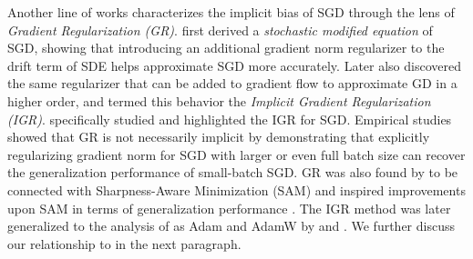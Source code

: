 

Another line of works characterizes the implicit bias of SGD through the lens of \textit{Gradient Regularization (GR)}. \citet{li2018stochasticmodifiedequationsdynamics} first derived a \emph{stochastic modified equation} of SGD, showing that introducing an additional gradient norm regularizer to the drift term of SDE helps approximate SGD more accurately. Later \citet{barrett2020implicit} also discovered the same regularizer that can be added to gradient flow to approximate GD in a higher order, and termed this behavior the \textit{Implicit Gradient Regularization (IGR)}.
\citet{smith2021originimplicitregularizationstochastic} specifically studied and highlighted the IGR for SGD. 
Empirical studies \citep{geiping2022stochastictrainingnecessarygeneralization, novack2022disentanglingmechanismsimplicitregularization} showed that GR is not necessarily implicit by demonstrating that explicitly regularizing gradient norm for SGD with larger or even full batch size can recover the generalization performance of small-batch SGD. GR was also found by \citet{karakida2023understandinggradientregularizationdeep} to be connected with Sharpness-Aware Minimization (SAM) \citep{foret2021sharpnessaware} and inspired improvements upon SAM in terms of generalization performance \citep{zhao2022penalizinggradientnormefficiently}. 
The IGR method was later generalized to the analysis of as Adam and AdamW by \citet{cattaneo2024implicitbiasadam} and \citet{ cattaneo2025memoryoptimizationalgorithmsimplicitly}. We further discuss our relationship to \citet{cattaneo2024implicitbiasadam} in the next paragraph.



